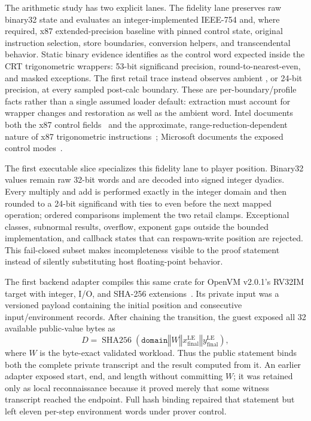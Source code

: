 The arithmetic study has two explicit lanes.  The fidelity lane preserves raw
binary32 state and evaluates an integer-implemented IEEE-754 and, where
required, x87 extended-precision baseline with pinned control state, original
instruction selection, store boundaries, conversion helpers, and
transcendental behavior.  Static binary evidence identifies  as
the control word expected inside the CRT trigonometric wrappers: 53-bit
significand precision, round-to-nearest-even, and masked exceptions.  The first
retail trace instead observes ambient , or 24-bit precision, at
every sampled post-calc boundary.  These are per-boundary/profile facts rather
than a single assumed loader default: extraction must account for wrapper
changes and restoration as well as the ambient word.  Intel
documents both the x87 control fields~\cite{intel-fp-reference} and the
approximate, range-reduction-dependent nature of x87 trigonometric
instructions~\cite{intel-x87-transcendentals}; Microsoft documents the exposed
control modes~\cite{microsoft-control87}.

The first executable slice specializes this fidelity lane to player position.
Binary32 values remain raw 32-bit words and are decoded into signed integer
dyadics.  Every multiply and add is performed exactly in the integer domain and
then rounded to a 24-bit significand with ties to even before the next mapped
operation; ordered comparisons implement the two retail clamps.  Exceptional
classes, subnormal results, overflow, exponent gaps outside the bounded
implementation, and callback states that can respawn-write position are
rejected.  This fail-closed subset makes incompleteness visible to the proof
statement instead of silently substituting host floating-point behavior.

The first backend adapter compiles this same crate for OpenVM v2.0.1's RV32IM
target with integer, I/O, and SHA-256 extensions~\cite{openvm-v2}.  Its private
input was a versioned payload containing the initial position and consecutive
input/environment records.  After chaining the transition, the guest exposed
all 32 available public-value bytes as
\[
  D = \operatorname{SHA256}(\texttt{domain}\mathbin\Vert W
      \mathbin\Vert x_{\mathrm{final}}^{\mathrm{LE}}
      \mathbin\Vert y_{\mathrm{final}}^{\mathrm{LE}}),
\]
where $W$ is the byte-exact validated workload.  Thus the public statement
binds both the complete private transcript and the result computed from it.
An earlier adapter exposed start, end, and length without committing $W$; it
was retained only as local reconnaissance because it proved merely that some
witness transcript reached the endpoint.  Full hash binding repaired that
statement but left eleven per-step environment words under prover control.

